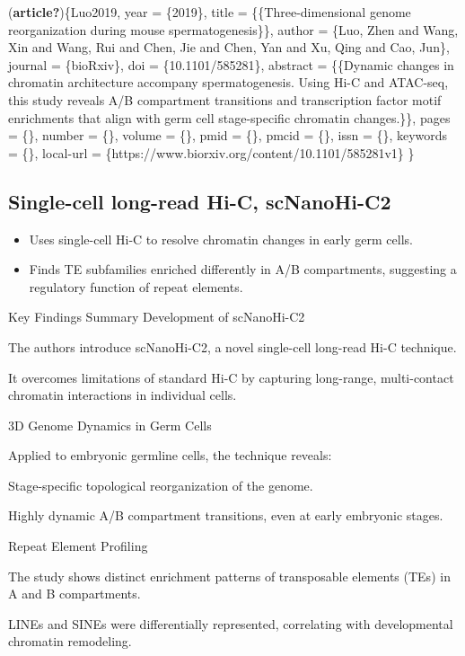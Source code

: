 \documentclass[
  a4paper,
]{scrbook}
\providecommand{\tightlist}{%
  \setlength{\itemsep}{0pt}\setlength{\parskip}{0pt}}
\begin{document}
(\textbf{article?})\{Luo2019, year = \{2019\}, title =
\{\{Three-dimensional genome reorganization during mouse
spermatogenesis\}\}, author = \{Luo, Zhen and Wang, Xin and Wang, Rui
and Chen, Jie and Chen, Yan and Xu, Qing and Cao, Jun\}, journal =
\{bioRxiv\}, doi = \{10.1101/585281\}, abstract = \{\{Dynamic changes in
chromatin architecture accompany spermatogenesis. Using Hi-C and
ATAC-seq, this study reveals A/B compartment transitions and
transcription factor motif enrichments that align with germ cell
stage-specific chromatin changes.\}\}, pages = \{\}, number = \{\},
volume = \{\}, pmid = \{\}, pmcid = \{\}, issn = \{\}, keywords = \{\},
local-url = \{https://www.biorxiv.org/content/10.1101/585281v1\} \}

\subsection{Single-cell long-read Hi-C,
scNanoHi-C2}\label{single-cell-long-read-hi-c-scnanohi-c2}

\begin{itemize}
\tightlist
\item
  Uses single-cell Hi-C to resolve chromatin changes in early germ
  cells.
\item
  Finds TE subfamilies enriched differently in A/B compartments,
  suggesting a regulatory function of repeat elements.
\end{itemize}

Key Findings Summary Development of scNanoHi-C2

The authors introduce scNanoHi-C2, a novel single-cell long-read Hi-C
technique.

It overcomes limitations of standard Hi-C by capturing long-range,
multi-contact chromatin interactions in individual cells.

3D Genome Dynamics in Germ Cells

Applied to embryonic germline cells, the technique reveals:

Stage-specific topological reorganization of the genome.

Highly dynamic A/B compartment transitions, even at early embryonic
stages.

Repeat Element Profiling

The study shows distinct enrichment patterns of transposable elements
(TEs) in A and B compartments.

LINEs and SINEs were differentially represented, correlating with
developmental chromatin remodeling.
\end{document}
